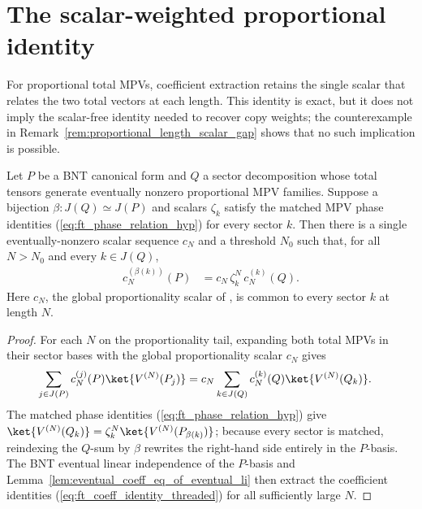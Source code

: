 \section{The scalar-weighted proportional identity}
\label{sec:app_ft_proportional_scalar}

For proportional total MPVs, coefficient extraction retains the single scalar
that relates the two total vectors at each length. This identity is exact, but
it does not imply the scalar-free identity needed to recover copy weights; the
counterexample in Remark~\ref{rem:proportional_length_scalar_gap} shows that no
such implication is possible.

\begin{lemma}%
    \label{lem:sector_bnt_coeff_identity_via_matched_mpv_phase_proportional}
    \leanok
    Let $P$ be a BNT canonical form and $Q$ a sector decomposition whose total
    tensors generate eventually nonzero proportional MPV families. Suppose a
    bijection $\beta:J(Q)\simeq J(P)$ and scalars $\zeta_k$ satisfy the matched
    MPV phase identities (\ref{eq:ft_phase_relation_hyp}) for every sector $k$.
    Then there is a single eventually-nonzero scalar sequence $c_N$ and a
    threshold $N_0$ such that, for all $N>N_0$ and every $k\in J(Q)$,
    \begin{align}
        c_N^{(\beta(k))}(P)
         & = c_N\,\zeta_k^N\,c_N^{(k)}(Q).
        \label{eq:ft_coeff_identity_threaded}
    \end{align}
    Here $c_N$, the global proportionality scalar of
    \cite[Theorem~\texttt{thm1}, lines~1167--1170]%
    {Cirac2016MPDO_arXiv}, is common to every sector $k$ at length $N$.
\end{lemma}

\begin{proof}\leanok
    For each $N$ on the proportionality tail, expanding both total MPVs in
    their sector bases with the global proportionality scalar $c_N$ gives
    \begin{align}
        \sum_{j\in J(P)} c_N^{(j)}(P)\ket{V^{(N)}(P_j)}
         & =
        c_N\sum_{k\in J(Q)} c_N^{(k)}(Q)\ket{V^{(N)}(Q_k)}.
        \notag
    \end{align}
    The matched phase identities (\ref{eq:ft_phase_relation_hyp}) give
    $\ket{V^{(N)}(Q_k)}=\zeta_k^N\ket{V^{(N)}(P_{\beta(k)})}$; because every
    sector is matched, reindexing the $Q$-sum by $\beta$ rewrites the right-hand
    side entirely in the $P$-basis. The BNT eventual linear independence of the
    $P$-basis and Lemma~\ref{lem:eventual_coeff_eq_of_eventual_li} then extract
    the coefficient identities (\ref{eq:ft_coeff_identity_threaded}) for all
    sufficiently large $N$.
\end{proof}


